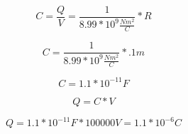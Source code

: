 \documentclass[11pt]{article}
\begin{document}
	\begin{equation}
		C = \frac{Q}{V} = \frac{1}{8.99*10^{9}\frac{Nm^2}{C}}*R
	\end{equation}
	
	\begin{equation}
		C = \frac{1}{8.99*10^{9}\frac{Nm^2}{C}}*.1m
	\end{equation}
	
	\begin{equation}
		C = 1.1*10^{-11}F
	\end{equation}
	
	\begin{equation}
		Q = C*V
	\end{equation}
	
	\begin{equation}
		Q = 1.1*10^{-11}F * 100000V = 1.1*10^{-6}C
	\end{equation}
\end{document}
